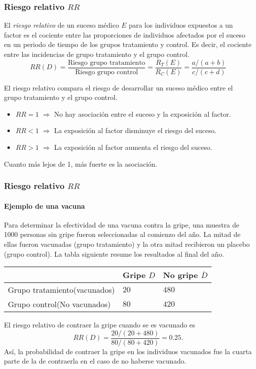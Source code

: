 \begin{frame}
\frametitle{Riesgo relativo $RR$}
\begin{definition}
El \emph{riesgo relativo} de un suceso médico $E$ para los individuos expuestos a un factor es el cociente entre las proporciones de individuos afectados por el suceso en un periodo de tiempo de los grupos tratamiento y control.
Es decir, el cociente entre las incidencias de grupo tratamiento y el grupo control.
\[
  RR(D)=\frac{\mbox{Riesgo grupo tratamiento}}{\mbox{Riesgo grupo control}}=\frac{R_T(E)}{R_C(E)}=\frac{a/(a+b)}{c/(c+d)}
\]
\end{definition}

El riesgo relativo compara el riesgo de desarrollar un suceso médico entre el grupo tratamiento y el grupo control.
\begin{itemize}
  \item $RR=1$ $\Rightarrow$ No hay asociación entre el suceso y la exposición al factor.
  \item $RR<1$ $\Rightarrow$ La exposición al factor disminuye el riesgo del suceso.
  \item $RR>1$ $\Rightarrow$ La exposición al factor aumenta el riesgo del suceso.
\end{itemize}
Cuanto más lejos de 1, más fuerte es la asociación. 
\end{frame}


\begin{frame}
\frametitle{Riesgo relativo $RR$}
\framesubtitle{Ejemplo de una vacuna}
Para determinar la efectividad de una vacuna contra la gripe, una muestra de 1000 personas sin gripe fueron seleccionadas al comienzo del año. 
La mitad de ellas fueron vacunadas (grupo tratamiento) y la otra mitad recibieron un placebo (grupo control).
La tabla siguiente resume los resultados al final del año.

\begin{center}
  \begin{tabular}{|m{3cm}|m{1.8cm}<{\centering}|m{1.8cm}<{\centering}|}
  \cline{2-3}
  \multicolumn{1}{c|}{} & Gripe $D$ & No gripe $\overline D$\\ 
  \hline
  Grupo tratamiento\newline (vacunados) & $20$ & $480$\\ 
  \hline 
  Grupo control\newline (No vacunados) & $80$ & $420$\\ 
  \hline
\end{tabular}
\end{center}

El riesgo relativo de contraer la gripe cuando se es vacunado es 
\[
  RR(D) = \frac{20/(20+480)}{80/(80+420)} = 0.25.
\]
Así, la probabilidad de contraer la gripe en los individuos vacunados fue la cuarta parte de la de contraerla en el caso de no haberse vacunado.
\end{frame}


